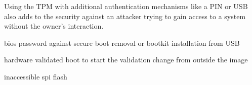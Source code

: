 Using the \ac{TPM} with additional authentication mechanisms like a \ac{PIN} or \ac{USB} also adds to the security against an attacker trying to gain access to a system without the owner's interaction.


bios password against secure boot removal or bootkit installation from USB

hardware validated boot to start the validation change from outside the image

inaccessible spi flash
















